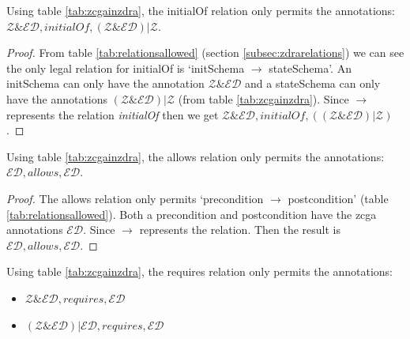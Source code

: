 \begin{thm}
Using table \ref{tab:zcgainzdra}, the initialOf relation only permits the annotations: \\
 $\mathcal{Z} \& \mathcal{ED}, initialOf, (\mathcal{Z} \& \mathcal{ED}) | \mathcal{Z}$.
\end{thm}

\begin{proof}
From table \ref{tab:relationsallowed} (section \ref{subsec:zdrarelations}) we can see the only legal relation for initialOf is `initSchema $\longrightarrow$ stateSchema'. An initSchema can only have the annotation $\mathcal{Z} \& \mathcal{ED}$ and a stateSchema can only have the annotations $(\mathcal{Z} \& \mathcal{ED}) | \mathcal{Z}$ (from table \ref{tab:zcgainzdra}). Since $\longrightarrow$ represents the relation \emph{initialOf} then we get $\mathcal{Z} \& \mathcal{ED}, initialOf, ((\mathcal{Z} \& \mathcal{ED}) | \mathcal{Z})$.
\end{proof}

\begin{thm}
Using table \ref{tab:zcgainzdra}, the allows relation only permits the annotations: \\
$\mathcal{ED}, allows, \mathcal{ED}$.
\end{thm}

\begin{proof}
The allows relation only permits `precondition $\longrightarrow$ postcondition' (table \ref{tab:relationsallowed}). Both a precondition and postcondition have the \gls{zcga} annotations $\mathcal{ED}$. Since $\longrightarrow$ represents the relation. Then the result is $\mathcal{ED}, allows, \mathcal{ED}$.
\end{proof}

\begin{thm}
Using table \ref{tab:zcgainzdra}, the requires relation only permits the annotations:
\begin{itemize}
\item $\mathcal{Z} \& \mathcal{ED}, requires, \mathcal{ED}$
\item $(\mathcal{Z} \& \mathcal{ED}) | \mathcal{ED}, requires, \mathcal{ED}$
\end{itemize}
\end{thm}

